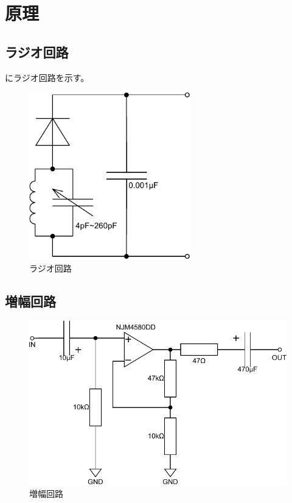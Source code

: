 \documentclass[report.tex]{subfiles}
\begin{document}
\section{原理}

\subsection{ラジオ回路}

にラジオ回路を示す。

\begin{figure}[H]
	\centering
	\includegraphics[width=7cm]{fig/radio.pdf}
	\caption{ラジオ回路}
	\label{fig:radio-circuit}
\end{figure}

\subsection{増幅回路}

\begin{figure}[H]
	\centering
	\includegraphics[width=13cm]{fig/amp.pdf}
	\caption{増幅回路}
	\label{fig:amplifier-circuit}
\end{figure}
\end{document}
